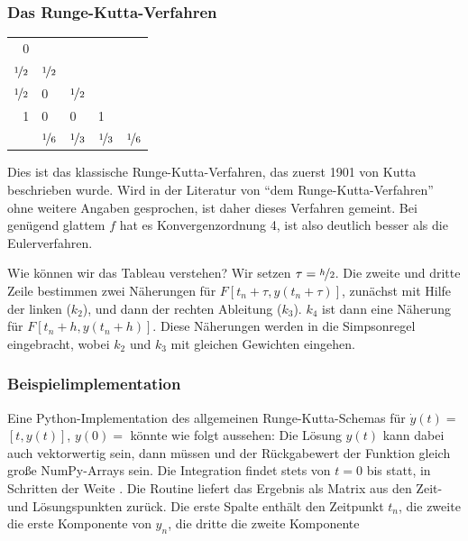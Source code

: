 \subsubsection{Das Runge-Kutta-Verfahren}

\begin{center}
  \renewcommand{\arraystretch}{1.3}
  \begin{tabular}{r|llll}
    0 & \\
    $\nicefrac{1}{2}$ & $\nicefrac{1}{2}$ \\
    $\nicefrac{1}{2}$ & 0 & $\nicefrac{1}{2}$ \\
    1 & 0 & 0 & 1 \\
    \hline
    & $\nicefrac{1}{6}$ &  $\nicefrac{1}{3}$ & 
    $\nicefrac{1}{3}$ &  $\nicefrac{1}{6}$
  \end{tabular}
\end{center}
Dies ist das klassische Runge-Kutta-Verfahren, das zuerst 1901 von
Kutta beschrieben wurde. Wird in der Literatur von "`dem
Runge-Kutta-Verfahren"' ohne weitere Angaben gesprochen, ist daher
dieses Verfahren gemeint. Bei genügend glattem $f$ hat es
Konvergenzordnung 4, ist also deutlich besser als die Eulerverfahren.

Wie können wir das Tableau verstehen?  Wir setzen
$\tau=\nicefrac{h}{2}$. Die zweite und dritte Zeile bestimmen zwei
Näherungen für $F[t_n+\tau, y(t_n+\tau)]$, zunächst mit Hilfe der
linken ($k_2$), und dann der rechten Ableitung ($k_3$). $k_4$ ist dann
eine Näherung für $F[t_n+h, y(t_n+h)]$. Diese Näherungen werden in die
Simpsonregel eingebracht, wobei $k_2$ und $k_3$ mit gleichen Gewichten
eingehen.

\subsubsection{Beispielimplementation}

Eine Python-Implementation des allgemeinen Runge-Kutta-Schemas für
$\dot y(t) = $$[t, y(t)]$, $y(0) =$  könnte wie folgt
aussehen:%
%
Die Lösung $y(t)$ kann dabei auch vektorwertig sein, dann müssen
 und der Rückgabewert der Funktion  gleich große
NumPy-Arrays sein. Die Integration findet stets von $t=0$ bis
 statt, in Schritten der Weite .  Die Routine
liefert das Ergebnis als Matrix aus den Zeit- und Lösungspunkten
zurück. Die erste Spalte enthält den Zeitpunkt $t_n$, die zweite die
erste Komponente von $y_n$, die dritte die zweite Komponente \usw

